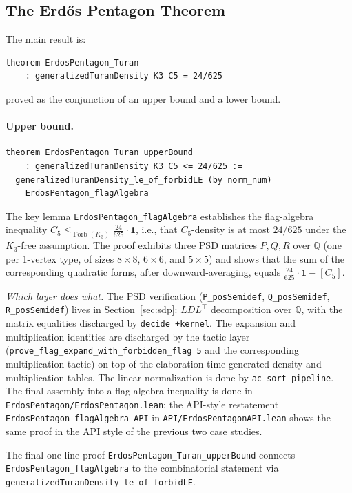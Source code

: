 \documentclass{article}
\newcommand{\Q}{\mathbb{Q}}
\newcommand{\forbLE}[1]{\leq_{\operatorname{Forb}(#1)}}
\newcommand{\lean}[1]{\texttt{#1}}
\begin{document}
\subsection{The Erd\H{o}s Pentagon Theorem}

The main result is:
\begin{lstlisting}
theorem ErdosPentagon_Turan
    : generalizedTuranDensity K3 C5 = 24/625
\end{lstlisting}
proved as the conjunction of an upper bound and a lower bound.

\paragraph{Upper bound.}
\begin{lstlisting}
theorem ErdosPentagon_Turan_upperBound
    : generalizedTuranDensity K3 C5 <= 24/625 :=
  generalizedTuranDensity_le_of_forbidLE (by norm_num)
    ErdosPentagon_flagAlgebra
\end{lstlisting}
The key lemma \lean{ErdosPentagon\_flagAlgebra} establishes the flag-algebra
inequality $C_5 \forbLE{K_3} \frac{24}{625} \cdot \mathbf{1}$, i.e., that
$C_5$-density is at most $24/625$ under the $K_3$-free assumption.  The proof
exhibits three PSD matrices $P, Q, R$ over $\mathbb{Q}$ (one per 1-vertex
type, of sizes $8\times 8$, $6\times 6$, and $5\times 5$) and shows that the
sum of the corresponding quadratic forms, after downward-averaging, equals
$\frac{24}{625} \cdot \mathbf{1} - [C_5]$.

\emph{Which layer does what.}  The PSD verification (\lean{P\_posSemidef},
\lean{Q\_posSemidef}, \lean{R\_posSemidef}) lives in
Section~\ref{sec:sdp}: $LDL^\top$ decomposition over $\Q$, with the matrix
equalities discharged by \lean{decide +kernel}.  The expansion and
multiplication identities are discharged by the tactic layer
(\lean{prove\_flag\_expand\_with\_forbidden\_flag 5} and the corresponding
multiplication tactic) on top of the elaboration-time-generated density and
multiplication tables.  The linear normalization is done by
\lean{ac\_sort\_pipeline}.  The final assembly into a flag-algebra inequality
is done in \lean{ErdosPentagon/ErdosPentagon.lean}; the API-style restatement
\lean{ErdosPentagon\_flagAlgebra\_API} in \lean{API/ErdosPentagonAPI.lean}
shows the same proof in the API style of the previous two case studies.

The final one-line proof \lean{ErdosPentagon\_Turan\_upperBound} connects
\lean{ErdosPentagon\_flagAlgebra} to the combinatorial statement via
\lean{generalizedTuranDensity\_le\_of\_forbidLE}.
\end{document}
